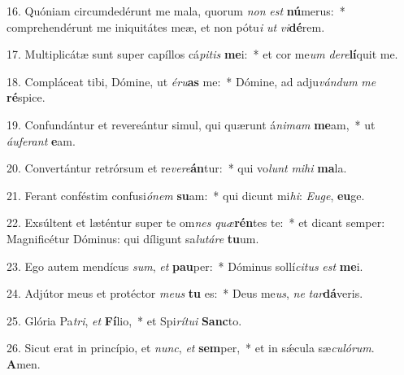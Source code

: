16. Quóniam circumdedérunt me mala, quorum \textit{non} \textit{est} \textbf{nú}merus:~*  comprehendérunt me iniquitátes meæ, et non pótu\textit{i} \textit{ut} \textit{vi}\textbf{dé}rem.\

17. Multiplicátæ sunt super capíllos cá\textit{pi}\textit{tis} \textbf{me}i:~*  et cor me\textit{um} \textit{de}\textit{re}\textbf{lí}quit me.\

18. Compláceat tibi, Dómine, ut \textit{é}\textit{ru}\textbf{as} me:~*  Dómine, ad adju\textit{ván}\textit{dum} \textit{me} \textbf{ré}spice.\

19. Confundántur et revereántur simul, qui quærunt á\textit{ni}\textit{mam} \textbf{me}am,~*  ut \textit{áu}\textit{fe}\textit{rant} \textbf{e}am.\

20. Convertántur retrórsum et re\textit{ve}\textit{re}\textbf{án}tur:~*  qui vo\textit{lunt} \textit{mi}\textit{hi} \textbf{ma}la.\

21. Ferant conféstim confusi\textit{ó}\textit{nem} \textbf{su}am:~*  qui dicunt mi\textit{hi}: \textit{Eu}\textit{ge}, \textbf{eu}ge.\

22. Exsúltent et læténtur super te om\textit{nes} \textit{quæ}\textbf{rén}tes te:~*  et dicant semper: Magnificétur Dóminus: qui díligunt sa\textit{lu}\textit{tá}\textit{re} \textbf{tu}um.\

23. Ego autem mendícus \textit{sum}, \textit{et} \textbf{pau}per:~*  Dóminus sollí\textit{ci}\textit{tus} \textit{est} \textbf{me}i.\

24. Adjútor meus et protéctor \textit{me}\textit{us} \textbf{tu} es:~*  Deus me\textit{us}, \textit{ne} \textit{tar}\textbf{dá}veris.\

25. Glória Pa\textit{tri}, \textit{et} \textbf{Fí}lio,~*  et Spi\textit{rí}\textit{tu}\textit{i} \textbf{Sanc}to.\

26. Sicut erat in princípio, et \textit{nunc}, \textit{et} \textbf{sem}per,~*  et in sǽcula sæ\textit{cu}\textit{ló}\textit{rum}. \textbf{A}men.\

